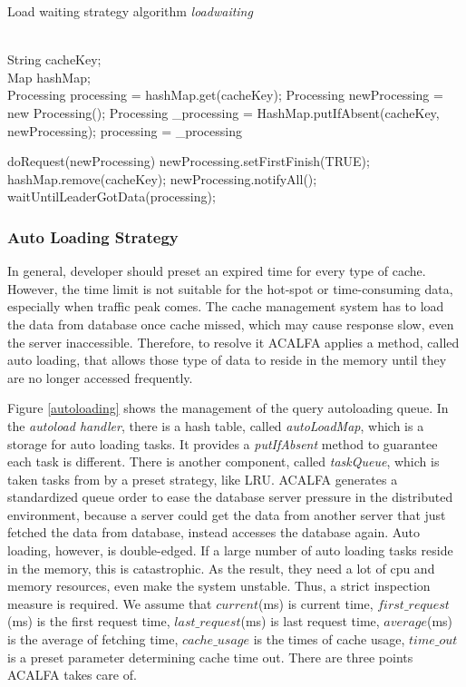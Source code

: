 \documentclass{singlecol-new}
\theoremstyle{TH}{
\newtheorem{lemma}{Lemma}
\newtheorem{theorem}[lemma]{Theorem}
\newtheorem{corrolary}[lemma]{Corrolary}
\newtheorem{conjecture}[lemma]{Conjecture}
\newtheorem{proposition}[lemma]{Proposition}
\newtheorem{claim}[lemma]{Claim}
\newtheorem{stheorem}[lemma]{Wrong Theorem}
}
\theoremstyle{THrm}{
\newtheorem{definition}{Definition}[section]
\newtheorem{question}{Question}[section]
\newtheorem{remark}{Remark}
\newtheorem{scheme}{Scheme}
}
\theoremstyle{THhit}{
\newtheorem{case}{Case}[section]
}
\begin{document}
\begin{algorithm}
\caption{Load waiting strategy algorithm \textit{loadwaiting}}
\label{loadwaitingalg}
\begin{algorithmic}[1]
\REQUIRE ~~\\
  String cacheKey;\\
  Map hashMap;
\ENSURE ~~\\

\STATE Processing processing = hashMap.get(cacheKey);
\STATE Processing newProcessing = new Processing();
\STATE Processing \_processing = HashMap.putIfAbsent(cacheKey, newProcessing);
\STATE processing = \_processing
\ENDIF
\ENDIF

\STATE doRequest(newProcessing)
\STATE newProcessing.setFirstFinish(TRUE);
\STATE hashMap.remove(cacheKey);
\STATE newProcessing.notifyAll();
\ELSE
\STATE waitUntilLeaderGotData(processing);
\ENDIF


\RETURN

\medskip

\end{algorithmic}
\end{algorithm}

\subsubsection{Auto Loading Strategy}
In general, developer should preset an expired time for every type of cache. However, the time limit is not suitable for the hot-spot or time-consuming data, especially when traffic peak comes. The cache management system has to load the data from database once cache missed, which may cause response slow, even the server inaccessible. Therefore, to resolve it ACALFA applies a method, called auto loading, that allows those type of data to reside in the memory until they are no longer accessed frequently.

Figure \ref{autoloading} shows the management of the query autoloading queue. In the \textit{autoload handler}, there is a hash table, called \textit{autoLoadMap}, which is a storage for auto loading tasks. It provides a \textit{putIfAbsent} method to guarantee each task is different. There is another component, called \textit{taskQueue}, which is taken tasks from  by a preset strategy, like LRU. ACALFA generates a standardized queue order to ease the database server pressure in the distributed environment, because a server could get the data from another server that just fetched the data from database, instead accesses the database again. Auto loading, however, is double-edged. If a large number of auto loading tasks reside in the memory, this is catastrophic. As the result, they need a lot of cpu and memory resources, even make the system unstable. Thus, a strict inspection measure is required. We assume that $current$(ms) is current time, $first\_request$(ms) is the first request time, $last\_request$(ms) is last request time,  $average$(ms) is the average of fetching time, $cache\_usage$ is the times of cache usage, $time\_out$ is a preset parameter determining cache time out. There are three points ACALFA takes care of.
\end{document}
